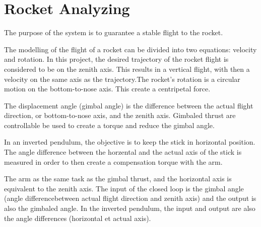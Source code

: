 \chapter{Rocket Analyzing}

The purpose of the system is to guarantee a stable flight to the rocket.

The modelling of the flight of a rocket can be divided into two equations: velocity and rotation. In this project, the desired trajectory of the rocket flight is considered to be on the zenith axis. This results in a vertical flight, with then a velocity on the same axis as the trajectory.The rocket's rotation is a circular motion on the bottom-to-nose axis. This create a centripetal force.

The displacement angle (gimbal angle) is the difference between the actual flight direction, or bottom-to-nose axis, and the zenith axis. Gimbaled thrust are controllable be used to create a torque and reduce the gimbal angle. 

In an inverted pendulum, the objective is to keep the stick in horizontal position. The angle difference between the horzental and the actual axis of the stick is measured in order to then create a compensation torque with the arm.

The arm as the same task as the gimbal thrust, and the horizontal axis is equivalent to the zenith axis.
The input of the closed loop is the gimbal angle (angle differencebetween actual flight direction and zenith axis) and the output is also the gimbaled angle. In the inverted pendulum, the input and output are also the angle differences (horizontal et actual axis). 